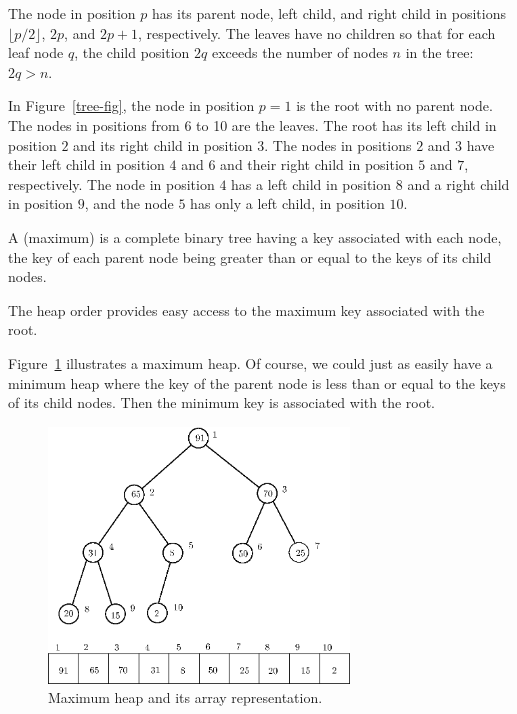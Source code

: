 The node in position $p$ has its parent node, left child, and right
child in positions $\lfloor p/2 \rfloor$, $2p$, and $2p + 1$,
respectively. The leaves have no children so that for each leaf node
$q$, the child position $2q$ exceeds the number of nodes $n$ in the
tree: $2q > n$.

\begin{Example}
In Figure~\ref{tree-fig},
the node in position $p=1$ is the root with no parent node. 
The nodes in positions from 6 to 10
are the leaves. The root has its
left child in position $2$ and its right child in position 
$3$. The nodes in positions $2$ and $3$ 
have their left child in position
$4$ and $6$ and their right child in position $5$ and $7$, respectively. 
The node in position $4$
has a left child in position $8$ and a right child in position
$9$, and the node $5$ has only a left child, in position $10$. 
\end{Example}

\begin{Definition}
A (maximum)  is a complete binary tree
having a key associated with each node,
the key of each parent node being greater than or
equal to the keys of its child nodes. 
\end{Definition} 

The heap order provides easy access to the maximum key  
associated with the root.

\begin{Example}
Figure~\ref{heap-fig} illustrates a maximum heap. Of
course, we could just as easily have a minimum heap  where
the key of the parent node is less than or equal to the keys
of its child nodes. Then the minimum key is associated with
the root. 
\end{Example}

\begin{figure}[htbp]
\begin{center}
\includegraphics[width=80mm]{figs/heapmjd2ipe.eps}
\caption{\label{heap-fig} Maximum heap and its array representation.}
\end{center}
\end{figure}

